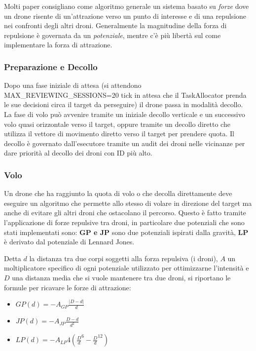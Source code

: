 \documentclass[a4paper,11pt,oneside, table]{article}
\begin{document}
Molti paper consigliano come algoritmo generale un sistema basato su \textit{forze} dove un drone risente di un'attrazione verso un punto di interesse e di una repulsione nei confronti degli altri droni.
Generalmente la magnitudine della forza di repulsione \`e governata da un \textit{potenziale}, mentre c'\`e pi\`u libert\`a sul come implementare la forza di attrazione.

\subsubsection{Preparazione e Decollo}

Dopo una fase iniziale di attesa (si attendono MAX\_REVIEWING\_SESSIONS=20 tick in attesa che il TaskAllocator prenda le sue decisioni circa il target da perseguire) il drone passa in modalit\`a decollo. La fase di volo pu\`o avvenire tramite un iniziale decollo verticale e un successivo volo quasi orizzontale verso il target, oppure tramite un decollo diretto che utilizza il vettore di movimento diretto verso il target per prendere quota.
Il decollo \`e governato dall'esecutore tramite un audit dei droni nelle vicinanze per dare priorit\`a al decollo dei droni con ID pi\`u alto.

\subsubsection{Volo}

Un drone che ha raggiunto la quota di volo o che decolla direttamente deve eseguire un algoritmo che permette allo stesso di volare in direzione del target ma anche di evitare gli altri droni che ostacolano il percorso.
Questo \`e fatto tramite l'applicazione di forze repulsive tra droni, in particolare due potenziali che sono stati implementati sono: \textbf{GP e JP} sono due potenziali ispirati dalla gravit\`a, \textbf{LP} \`e derivato dal potenziale di Lennard Jones.

Detta $d$ la distanza tra due corpi soggetti alla forza repulsiva (i droni), $A$ un moltiplicatore specifico di ogni potenziale utilizzato per ottimizzarne l'intensit\`a e $D$ una distanza media che si vuole mantenere tra due droni, si riportano le formule per ricavare le forze di attrazione:

\begin{itemize}
  \item $GP(d) = -A_{GP} \frac {|D - d|} {d}$
  \item $JP(d) = -A_{JP} \frac {D - d} {d^2}$
  \item $LP(d) = -A_{LP} 4 ({\frac {D} {d}}^6 - {\frac {D} {d}}^{12})$
\end{itemize}
\end{document}
